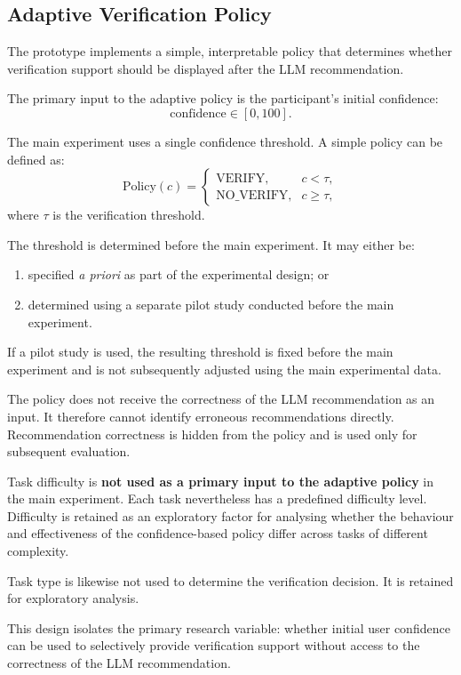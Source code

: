 \documentclass[oneside,final,14pt,a4paper]{extreport}
\theoremstyle{definition}
\theoremstyle{remark}
\begin{document}
\subsection{Adaptive Verification Policy}
\label{subsec:policy}
The prototype implements a simple, interpretable policy that determines whether
verification support should be displayed after the LLM recommendation.

The primary input to the adaptive policy is the participant's initial
confidence:
\[
\text{confidence} \in [0,100].
\]

The main experiment uses a single confidence threshold. A simple policy can be
defined as:
\[
\text{Policy}(c) =
\begin{cases}
\text{VERIFY}, & c < \tau,\\
\text{NO\_VERIFY}, & c \geq \tau,
\end{cases}
\]
where $\tau$ is the verification threshold.

The threshold is determined before the main experiment. It may either be:
\begin{enumerate}
    \item specified \emph{a priori} as part of the experimental design; or
    \item determined using a separate pilot study conducted before the main
    experiment.
\end{enumerate}

If a pilot study is used, the resulting threshold is fixed before the main
experiment and is not subsequently adjusted using the main experimental data.

The policy does not receive the correctness of the LLM recommendation as an
input. It therefore cannot identify erroneous recommendations directly.
Recommendation correctness is hidden from the policy and is used only for
subsequent evaluation.

Task difficulty is \textbf{not used as a primary input to the adaptive policy}
in the main experiment. Each task nevertheless has a predefined difficulty
level. Difficulty is retained as an exploratory factor for analysing whether
the behaviour and effectiveness of the confidence-based policy differ across
tasks of different complexity.

Task type is likewise not used to determine the verification decision. It is
retained for exploratory analysis.

This design isolates the primary research variable: whether initial user
confidence can be used to selectively provide verification support without
access to the correctness of the LLM recommendation.
\end{document}
